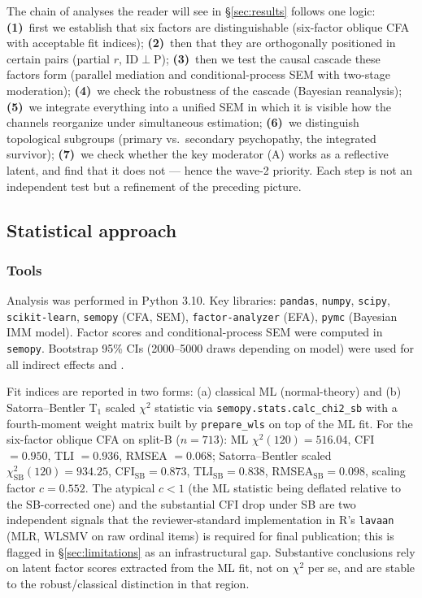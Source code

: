 The chain of analyses the reader will see in §\ref{sec:results} follows one logic: \textbf{(1)}~first we establish that six factors are distinguishable (six-factor oblique CFA with acceptable fit indices); \textbf{(2)}~then that they are orthogonally positioned in certain pairs (partial $r$, ID$\perp$P); \textbf{(3)}~then we test the causal cascade these factors form (parallel mediation and conditional-process SEM with two-stage moderation); \textbf{(4)}~we check the robustness of the cascade (Bayesian reanalysis); \textbf{(5)}~we integrate everything into a unified SEM in which it is visible how the channels reorganize under simultaneous estimation; \textbf{(6)}~we distinguish topological subgroups (primary vs.\ secondary psychopathy, the integrated survivor); \textbf{(7)}~we check whether the key moderator (A) works as a reflective latent, and find that it does not --- hence the wave-2 priority. Each step is not an independent test but a refinement of the preceding picture.

\subsection{Statistical approach}
\label{subsec:stat_approach}

\subsubsection{Tools}

Analysis was performed in Python 3.10. Key libraries: \texttt{pandas}, \texttt{numpy}, \texttt{scipy}, \texttt{scikit-learn}, \texttt{semopy} (CFA, SEM), \texttt{factor-analyzer} (EFA), \texttt{pymc} (Bayesian IMM model). Factor scores and conditional-process SEM were computed in \texttt{semopy}. Bootstrap 95\% CIs (2000--5000 draws depending on model) were used for all indirect effects and \IMM{}.

Fit indices are reported in two forms: (a) classical ML (normal-theory) and (b) Satorra--Bentler T$_1$ scaled $\chi^2$ statistic via \texttt{semopy.stats.calc\_chi2\_sb} with a fourth-moment weight matrix built by \texttt{prepare\_wls} on top of the ML fit. For the six-factor oblique CFA on split-B ($n = 713$): ML $\chi^2(120) = 516.04$, CFI $= 0.950$, TLI $= 0.936$, RMSEA $= 0.068$; Satorra--Bentler scaled $\chi^2_{\mathrm{SB}}(120) = 934.25$, CFI$_{\mathrm{SB}} = 0.873$, TLI$_{\mathrm{SB}} = 0.838$, RMSEA$_{\mathrm{SB}} = 0.098$, scaling factor $c = 0.552$. The atypical $c < 1$ (the ML statistic being deflated relative to the SB-corrected one) and the substantial CFI drop under SB are two independent signals that the reviewer-standard implementation in R's \texttt{lavaan} (MLR, WLSMV on raw ordinal items) is required for final publication; this is flagged in §\ref{sec:limitations} as an infrastructural gap. Substantive conclusions rely on latent factor scores extracted from the ML fit, not on $\chi^2$ per se, and are stable to the robust/classical distinction in that region.

